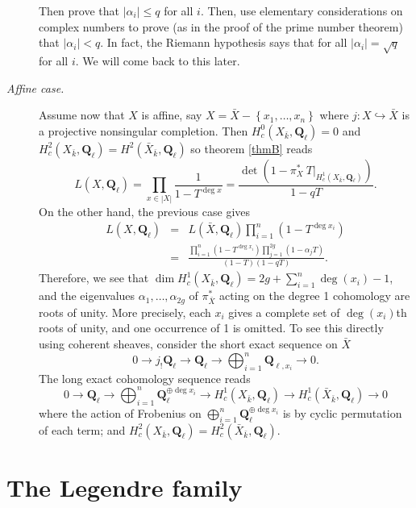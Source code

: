 \begin{description}
Then prove that $|\alpha_i| \leq q$ for all $i$. Then, use elementary
considerations on complex numbers to prove (as in the proof of the prime number
theorem) that $|\alpha_i| < q$. In fact, the Riemann hypothesis says that for
all $|\alpha_i| = \sqrt q$ for all $i$. We will come back to this later.

\item[\it Affine case.]
Assume now that $X$ is affine, say $X= \bar X-\left\{x_1, \ldots, x_n\right\}$
where $j: X \hookrightarrow \bar X$ is a projective nonsingular completion.
Then $H_c^0(X_{\bar k}, \mathbf{Q}_\ell) = 0$ and $H_c^2(X_{\bar k},
\mathbf{Q}_\ell) = H^2(\bar X_{\bar k}, \mathbf{Q}_\ell)$ so theorem \ref{thmB}
reads
$$
L(X, \mathbf{Q}_\ell) = \prod_{x\in |X|}\frac{1}{1-T^{\deg x}} =
\frac{\det\left(1-\pi_X^*\ T\big|_{H_c^1(X_{\bar k},
\mathbf{Q}_\ell)}\right)}{1-qT}.
$$
On the other hand, the previous case gives
\begin{eqnarray*}
L(X, \mathbf{Q}_\ell) & = & L(\bar X,
\mathbf{Q}_\ell)\prod_{i=1}^n\left(1-T^{\deg x_i}\right) \\
& = & \frac{\prod_{i=1}^n(1-T^{\deg
x_i})\prod_{j=1}^{2g}(1-\alpha_jT)}{(1-T)(1-qT)}.
\end{eqnarray*}
Therefore, we see that $\dim H_c^1(X_{\bar k}, \mathbf{Q}_\ell) =
2g+\sum_{i=1}^n \deg(x_i)-1$, and the eigenvalues $\alpha_1, \ldots,
\alpha_{2g}$ of $\pi_{\bar X}^*$ acting on the degree 1 cohomology are roots of
unity. More precisely, each $x_i$ gives a complete set of $\deg(x_i)$th roots
of unity, and one occurrence of 1 is omitted. To see this directly using
coherent sheaves, consider the short exact sequence on $\bar X$
$$
0\to j_!\mathbf{Q}_\ell\to \mathbf{Q}_\ell\to\bigoplus_{i=1}^n
\mathbf{Q}_{\ell, x_i}\to 0.
$$
The long exact cohomology sequence reads
$$
0\to \mathbf{Q}_\ell \to \bigoplus_{i=1}^n \mathbf{Q}_\ell^{\oplus \deg x_i}
\to H_c^1(X_{\bar k}, \mathbf{Q}_\ell) \to H_c^1(\bar X_{\bar k},
\mathbf{Q}_\ell)\to 0
$$
where the action of Frobenius on $\bigoplus_{i=1}^n \mathbf{Q}_\ell^{\oplus
\deg x_i}$ is by cyclic permutation of each term; and $H_c^2(X_{\bar k},
\mathbf{Q}_\ell) = H_c^2(\bar X_{\bar k}, \mathbf{Q}_\ell)$.
\end{description}

\section{The Legendre family}

